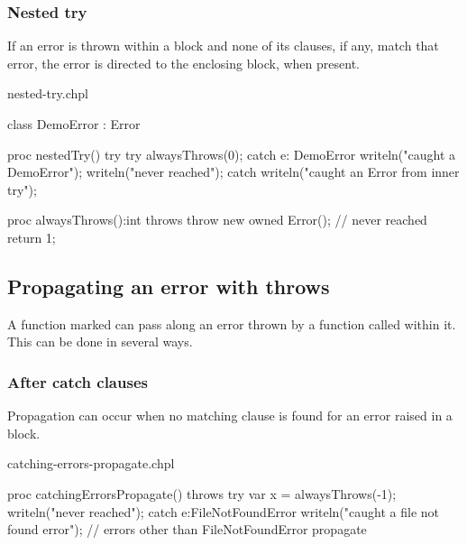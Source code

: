 \subsubsection{Nested try}
\label{Nested_try}

If an error is thrown within a  block and none of its
 clauses, if any, match that error, the error
is directed to the enclosing  block, when present.

\begin{chapelexample}{nested-try.chpl}
\begin{chapel}
class DemoError : Error { }

proc nestedTry() {
  try {
    try {
      alwaysThrows(0);
    } catch e: DemoError {
      writeln("caught a DemoError");
    }
    writeln("never reached");
  } catch {
    writeln("caught an Error from inner try");
  }
}
\end{chapel}
\begin{chapelpost}
proc alwaysThrows():int throws {
  throw new owned Error();
  // never reached
  return 1;
}
\end{chapelpost}
\begin{chapeloutput}
\end{chapeloutput}
\end{chapelexample}

\subsection{Propagating an error with throws}
\label{Propagating_an_error_with_throws}

A function marked  can pass along an error thrown by a
function called within it. This can be done in several ways.

\subsubsection{After catch clauses}
\label{After_catch_clauses}

Propagation can occur when no matching  clause is found for an
error raised in a  block.

\begin{chapelexample}{catching-errors-propagate.chpl}
\begin{chapel}
proc catchingErrorsPropagate() throws {
  try {
    var x = alwaysThrows(-1);
    writeln("never reached");
  } catch e:FileNotFoundError {
    writeln("caught a file not found error");
  }
  // errors other than FileNotFoundError propagate
}
\end{chapel}
\begin{chapelpost}
\end{chapelpost}
\begin{chapeloutput}
\end{chapeloutput}
\end{chapelexample}

